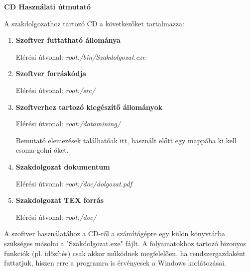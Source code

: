 \pagestyle{empty}

\noindent \textbf{\Large CD Használati útmutató}

\vskip 1cm

\noindent A szakdolgozathoz tartozó CD a következőket tartalmazza:
\begin{enumerate}
\item \textbf{Szoftver futtatható állománya}

Elérési útvonal: \textit{root:/bin/Szakdolgozat.exe}

\item \textbf{Szoftver forráskódja}

Elérési útvonal: \textit{root:/src/}
\item \textbf{Szoftverhez tartozó kiegészítő állományok}

Elérési útvonal: \textit{root:/datamining/}

Bemutató elemezések találhatóak itt, használt előtt egy mappába ki kell csoma\hyp{}golni őket.
\item \textbf{Szakdolgozat dokumentum}

Elérési útvonal: \textit{root:/doc/dolgozat.pdf}
\item \textbf{Szakdolgozat TEX forrás}

Elérési útvonal: \textit{root:/doc/}
\end{enumerate}

A szoftver használatához a CD-ről a számítógépre egy külön könyvtárba szükséges másolni a "Szakdolgozat.exe" fájlt. A folyamatokhoz tartozó bizonyos funkciók (pl. időzítés) csak akkor működnek megfelelően, ha rendszergazdaként futtatjuk, hiszen erre a programra is érvényesek a Windows korlátozásai.